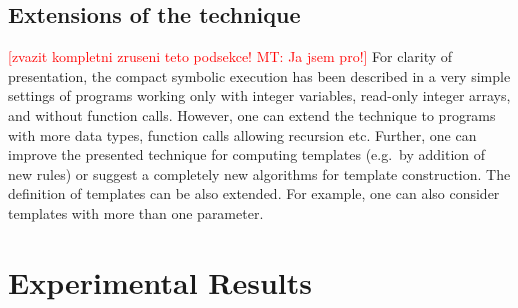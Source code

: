 \documentclass{sig-alternate}%
\newcommand{\todo}[1]{{\scriptsize{{\textcolor{red}{[#1]}}}}}
\begin{document}

\subsection{Extensions of the technique}

\todo{zvazit kompletni zruseni teto podsekce! MT: Ja jsem pro!}
For clarity of presentation, the compact symbolic execution has been
described in a very simple settings of programs working only with integer
variables, read-only integer arrays, and without function calls. However,
one can extend the technique to programs with more data types, function
calls allowing recursion etc. Further, one can improve the presented
technique for computing templates (e.g.~by addition of new rules) or suggest
a completely new algorithms for template construction. The definition of
templates can be also extended. For example, one can also consider templates
with more than one parameter.







\section{Experimental Results}\label{sec:experiments}
\end{document}
